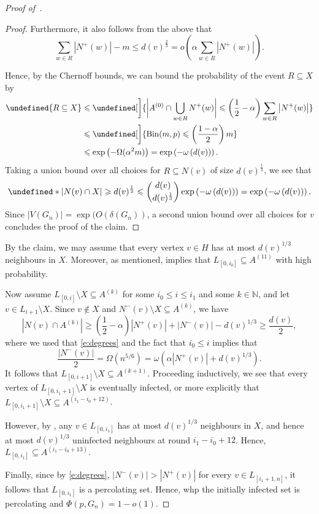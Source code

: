 \documentclass[reqno,a4paper,11pt]{amsart}
\theoremstyle{definition}
\newcommand{\Bin}{\operatorname{Bin}}
\renewcommand{\leq}{\leqslant}
\renewcommand{\geq}{\geqslant}
\let\Pr\undefined
\begin{document}
\begin{proof}[Proof of~]
\begin{proof}
    Furthermore, it also follows from the above that
    \[
      \sum_{w \in R} |N^+(w)|  - m \leq d(v)^{\frac{2}{3}}  = o\left( \alpha \sum_{w \in R} |N^+(w)| \right).
    \]

    Hence, by the Chernoff bounds, we can bound the probability of the event $R \subseteq X$ by
    \begin{align*}
      \Pr{R \subseteq X} &\leq \Pr[\bigg]{\bigg|A^{(0)} \cap \bigcup_{w \in R} N^+(w)\bigg| \leq \left(\frac{1}{2}-\alpha\right) \sum_{w \in R}\big| N^+(w)\big|}\\
                         & \leq \Pr[\bigg]{\Bin(m, p) \leq \left(\frac{1-\alpha}{2}\right) m}\\
                         & \leq \exp\left( - \Omega(\alpha^2 m)\right)= \exp\left(-\omega\left(d(v)\right)\right).
    \end{align*}
    Taking a union bound over all choices for $R \subseteq N(v)$ of size $d(v)^{\frac{1}{3}}$, we see that
    \[
      \Pr*{|N(v) \cap X| \geq d(v)^{\frac{1}{3}}} \leq \binom{d(v)}{d(v)^{\frac{1}{3}}} \exp\left(-\omega\left(d(v)\right)\right)=\exp\left(-\omega\left(d(v)\right)\right).
    \]
    Since $|V(G_n)| = \exp(O(\delta(G_n))$, a second union bound over all choices for $v$ concludes the proof of the claim.
  \end{proof}

  By the claim, we may assume that every vertex $v \in H$ has at most $d(v)^{1/3}$ neighbours in $X$.
  Moreover, as mentioned,  implies that $L_{[0,i_0]} \subseteq A^{(11)}$ with high probability.

  Now assume $L_{[0, i]} \setminus X \subseteq A^{(k)}$ for some $i_0 \leq i \leq i_1$ and some $k \in \mathbb{N}$, and let $v \in L_{i+1} \setminus X$.
  Since $v \not\in X$ and $N^-(v) \setminus X \subseteq A^{(k)}$, we have
  \[
    \left|N(v) \cap A^{(k)}\right| \geq \left(\frac{1}{2}-\alpha\right)\left|N^+(v)\right| + |N^-(v)| - d(v)^{1/3} \geq \frac{d(v)}{2},
  \]
  where we used that \eqref{e:degrees} and the fact that $i_0 \leq i$ implies that
  \[
    \frac{|N^-(v)|}{2} = \Omega(n^{5/6}) = \omega\left(  \alpha |N^+(v)| + d(v)^{1/3}\right).
  \]
  It follows that $L_{[0, i+1]} \setminus X \subseteq A^{(k+1)}$.
  Proceeding inductively, we see that every vertex of $L_{[0,i_1+1]} \setminus X$ is eventually infected, or more explicitly that $L_{[0,i_1+1]} \setminus X \subseteq A^{(i_1-i_0+12)}$.


  However, by , any $v \in L_{[0,i_1]}$ has at most $d(v)^{1/3}$ neighbours in $X$, and hence at most $d(v)^{1/3}$ uninfected neighbours at round $i_1-i_0+12$.
  Hence, $L_{[0,i_1]} \subseteq A^{(i_1-i_0+13)}$.

  Finally, since by \eqref{e:degrees}, $|N^-(v)| > |N^+(v)|$ for every $v \in L_{[i_1+1, n]}$, it follows that $L_{[0,i_1]}$ is a percolating set.
  Hence, whp the initially infected set is percolating and $\Phi(p,G_n) = 1-o(1)$.
\end{proof}
\end{document}
